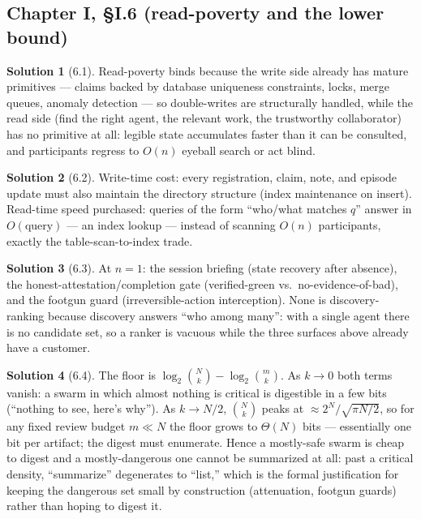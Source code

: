 \documentclass[11pt,a4paper]{article}
\theoremstyle{definition}
\newtheorem{sol}{Solution}
\theoremstyle{remark}
\begin{document}
\subsection{Chapter I, \S I.6 (read-poverty and the lower bound)}

\begin{sol}[6.1]
Read-poverty binds because the write side already has mature primitives --- claims backed by database uniqueness constraints, locks, merge queues, anomaly detection --- so double-writes are structurally handled, while the read side (find the right agent, the relevant work, the trustworthy collaborator) has no primitive at all: legible state accumulates faster than it can be consulted, and participants regress to $O(n)$ eyeball search or act blind.
\end{sol}

\begin{sol}[6.2]
Write-time cost: every registration, claim, note, and episode update must also maintain the directory structure (index maintenance on insert). Read-time speed purchased: queries of the form ``who/what matches $q$'' answer in $O(\text{query})$ --- an index lookup --- instead of scanning $O(n)$ participants, exactly the table-scan-to-index trade.
\end{sol}

\begin{sol}[6.3]
At $n{=}1$: the session briefing (state recovery after absence), the honest-attestation/completion gate (verified-green vs.\ no-evidence-of-bad), and the footgun guard (irreversible-action interception). None is discovery-ranking because discovery answers ``who among many'': with a single agent there is no candidate set, so a ranker is vacuous while the three surfaces above already have a customer.
\end{sol}

\begin{sol}[6.4]
The floor is $\log_2\binom{N}{k} - \log_2\binom{m}{k}$. As $k \to 0$ both terms vanish: a swarm in which almost nothing is critical is digestible in a few bits (``nothing to see, here's why''). As $k \to N/2$, $\binom{N}{k}$ peaks at $\approx 2^N/\sqrt{\pi N/2}$, so for any fixed review budget $m \ll N$ the floor grows to $\Theta(N)$ bits --- essentially one bit per artifact; the digest must enumerate. Hence a mostly-safe swarm is cheap to digest and a mostly-dangerous one cannot be summarized at all: past a critical density, ``summarize'' degenerates to ``list,'' which is the formal justification for keeping the dangerous set small by construction (attenuation, footgun guards) rather than hoping to digest it.
\end{sol}
\end{document}
